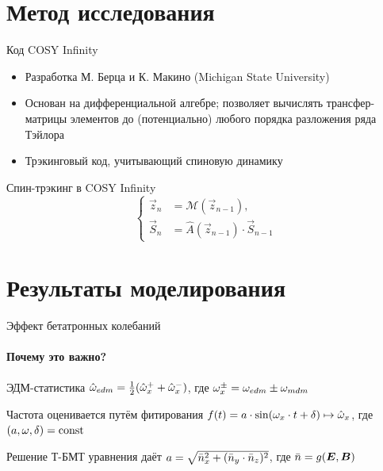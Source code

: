\documentclass[14pt]{beamer}
\begin{document}
\section{Метод исследования}
\begin{frame}{Код COSY Infinity}
	\begin{itemize}
		\item Разработка М. Берца и К. Макино (Michigan State University)
		\item Основан на дифференциальной алгебре; позволяет вычислять трансфер-матрицы элементов до (потенциально) любого порядка разложения ряда Тэйлора
		\item Трэкинговый код, учитывающий спиновую динамику
	\end{itemize}
\end{frame}
\begin{frame}{Спин-трэкинг в COSY Infinity} 
	\[
	\begin{cases}
	\vec{z}_n &= \mathcal{M}(\vec{z}_{n-1}), \\
	\vec{S}_n &= \hat A(\vec z_{n-1})\cdot \vec S_{n-1}
	\end{cases}
	\]
\end{frame}

\section{Результаты моделирования}
\begin{frame}{Эффект бетатронных колебаний}
\framesubtitle{Почему это важно?}
\begin{block}{ЭДМ-статистика}
	$\hat{\omega}_{edm} = \frac12(\hat{\omega}_x^+ + \hat{\omega}_x^-)$, где $\omega_x^\pm = \omega_{edm} \pm \omega_{mdm}$
\end{block}
\begin{block}{Частота оценивается путём фитирования}
	$f(t) = a\cdot\sin(\omega_x\cdot t + \delta) \mapsto \hat{\omega}_x$, где $(a,\omega, \delta) = \mathrm{const}$
\end{block}
\begin{block}{Решение Т-БМТ уравнения даёт}
	$a = \sqrt{\bar n_x^2 + (\bar n_y\cdot\bar n_z)^2}$, где $\bar n = g(\boldsymbol E, \boldsymbol B)$
\end{block}
\end{frame}
\end{document}
